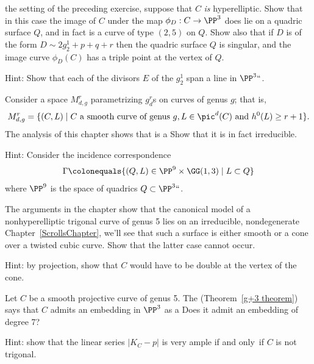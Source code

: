 \begin{exercise}\label{ex7.4}
%
the setting of the preceding exercise,
suppose that $C$ \emph{is} hyperelliptic. Show that in this case the
image of $C$ under the map $\phi_D : C \to \PP^3$ does lie on a
quadric surface $Q$, and in fact is a curve of type $(2,5)$ on $Q$.
Show also that if $D$ is of the form $D \sim 2g^1_2 + p + q + r$ then
the quadric surface $Q$ is singular, and the image curve $\phi_D(C)$
has a triple point at the vertex of $Q$.

Hint: Show that each of the divisors $E$ of the $g^1_2$ span a line in $\PP^3` `$.
 \end{exercise}

\begin{exercise}\label{ex7.5}
Consider a space $M^r_{d,g}$ parametrizing $g^r_d$s on curves of genus $g$; that is,
$$
M^r_{d,g} = \{ (C, L) \mid C \text{ a smooth curve of genus } g, L \in \pic^d(C) \text{ and } h^0(L) \geq r+1 \}.
$$
The analysis of this chapter shows that
is a
%
Show that it is in fact irreducible.

Hint: Consider the incidence correspondence
$$
\Gamma \colonequals  \{ (Q, L) \in \PP^9 \times \GG(1,3) \mid L \subset Q \}
$$
where $\PP^9$ is the space of quadrics $Q\subset \PP^3` `$.
\end{exercise}

\begin{exercise}\label{ex7.6}
The arguments in the chapter show that the canonical model of a
nonhyperelliptic trigonal curve of genus 5 lies on an irreducible,
nondegenerate
%
Chapter~\ref{ScrollsChapter}, we'll see that such a surface is either
smooth or a cone over a twisted cubic curve. Show that the latter case
cannot occur.

Hint: by projection, show that $C$ would have to be double at the vertex of the cone.
\end{exercise}

\begin{exercise}\label{ex7.7}
Let $C$ be a smooth projective curve of genus 5. The
%
(Theorem~\ref{g+3 theorem}) says that $C$ admits an embedding in
$\PP^3$ as a
%
Does it admit an embedding of degree 7?

Hint: show that the linear series $|K_C - p|$ is very ample if and only~if $C$ is not trigonal.
\end{exercise}

